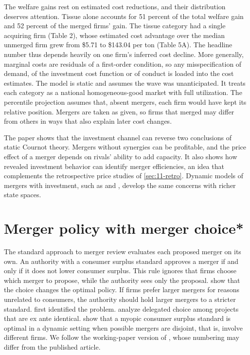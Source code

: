 The welfare gains rest on estimated cost reductions, and their distribution deserves attention. Tissue alone accounts
for 51 percent of the total welfare gain and 52 percent of the merged firms' gain. The tissue category had a single
acquiring firm (Table 2), whose estimated cost advantage over the median unmerged firm grew from \$5.71 to \$143.04 per
ton (Table 5A). The headline number thus depends heavily on one firm's inferred cost decline. More generally, marginal
costs are residuals of a first-order condition, so any misspecification of demand, of the investment cost function or
of conduct is loaded into the cost estimates. The model is static and assumes the wave was unanticipated. It treats
each category as a national homogeneous-good market with full utilization. The percentile projection assumes that, absent
mergers, each firm would have kept its relative position. Mergers are taken as given, so firms that merged may differ
from others in ways that also explain later cost changes.

The paper shows that the investment channel can reverse two conclusions of static Cournot theory. Mergers without
synergies can be profitable, and the price effect of a merger depends on rivals' ability to add capacity. It also
shows how revealed investment behavior can identify merger efficiencies, an idea that complements the retrospective
price studies of \cref{sec:11-retro}. Dynamic models of mergers with investment, such as \citet{BerryPakes1993} and
\citet{Gowrisankaran1999}, develop the same concerns with richer state spaces.

\section{Merger policy with merger choice*}\label{sec:11-policy}

The standard approach to merger review evaluates each proposed merger on its own. An authority with a consumer surplus
standard approves a merger if and only if it does not lower consumer surplus. This rule ignores that firms choose which
merger to propose, while the authority sees only the proposal. \citet{NockeWhinston2013} show that the choice changes
the optimal policy. If firms prefer larger mergers for reasons unrelated to consumers, the authority should hold larger
mergers to a stricter standard. \citet{Lyons2003} first identified the problem. \citet{ArmstrongVickers2010} analyze
delegated choice among projects that are ex ante identical. \citet{NockeWhinston2010} show that a myopic consumer
surplus standard is optimal in a dynamic setting when possible mergers are disjoint, that is, involve different firms.
We follow the working-paper version of \citet{NockeWhinston2013}, whose numbering may differ from the published
article.

